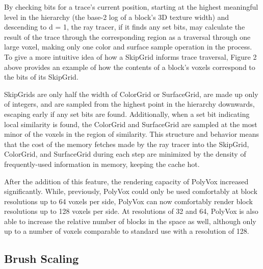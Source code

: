 \documentclass[onecolumn, draftclsnofoot,10pt, compsoc]{IEEEtran}
\begin{document}
By checking bits for a trace’s current position, starting at the highest meaningful level in the hierarchy (the base-2 log of a block’s 3D texture width) and descending to d = 1, the ray tracer, if it finds any set bits, may calculate the result of the trace through the corresponding region as a traversal through one large voxel, making only one color and surface sample operation in the process. To give a more intuitive idea of how a SkipGrid informs trace traversal, Figure 2 above provides an example of how the contents of a block's voxels correspond to the bits of its SkipGrid.

SkipGrids are only half the width of ColorGrid or SurfaceGrid, are made up only of integers, and are sampled from the highest point in the hierarchy downwards, escaping early if any set bits are found. Additionally, when a set bit indicating local similarity is found, the ColorGrid and SurfaceGrid are sampled at the most minor of the voxels in the region of similarity. This structure and behavior means that the cost of the memory fetches made by the ray tracer into the SkipGrid, ColorGrid, and SurfaceGrid during each step are minimized by the density of frequently-used information in memory, keeping the cache hot.

After the addition of this feature, the rendering capacity of PolyVox increased significantly. While, previously, PolyVox could only be used comfortably at block resolutions up to 64 voxels per side, PolyVox can now comfortably render block resolutions up to 128 voxels per side. At resolutions of 32 and 64, PolyVox is also able to increase the relative number of blocks in the space as well, although only up to a number of voxels comparable to standard use with a resolution of 128.

\subsection{Brush Scaling}
\end{document}
